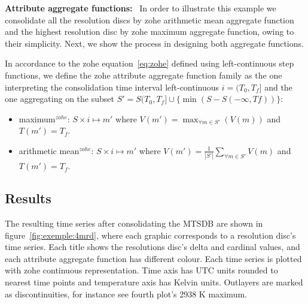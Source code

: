 \vspace{5pt} \noindent
{\bf Attribute aggregate functions:} \
In order to illustrate this example we consolidate all the resolution
discs by zohe arithmetic mean aggregate function and the highest
resolution disc by zohe maximum aggregate function, owing to their
simplicity. Next, we show the process in designing both aggregate
functions.


In accordance to the zohe equation~\ref{eq:zohe} defined using
left-continuous step functions, we define the zohe attribute aggregate
function family as the one interpreting the consolidation time
interval left-continuous $i=(T_0,T_f]$
%
and the one aggregating on the subset $S'=S(T_0,T_f] \cup \{\min(S-S(-\infty,Tf))\}$: 
%
\begin{itemize}
\item maximum$^{zohe}$: $S \times i \mapsto m'$ where $V(m') =
  \max_{\forall m \in S'}(V(m))$ and $T(m')=T_f$.
\item arithmetic mean$^{zohe}$: $S \times i \mapsto m'$ where $V(m')
  = \frac{1}{|S'|} \sum\limits_{\forall m\in S'} V(m)$ and
  $T(m')=T_f$. 
\end{itemize}







\subsection{Results}

The resulting time series after consolidating the MTSDB are shown in
figure~\ref{fig:exemple:4mrd}, where each graphic corresponds to a
resolution disc's time series. Each title shows the
resolutions disc's delta and cardinal values, and each attribute
aggregate function has different colour.  Each time series
is plotted with zohe continuous representation. Time axis has
UTC units rounded to nearest time points
and temperature axis has Kelvin
units. Outlayers are marked as discontinuities, for instance see
fourth plot's 2938 K maximum.


